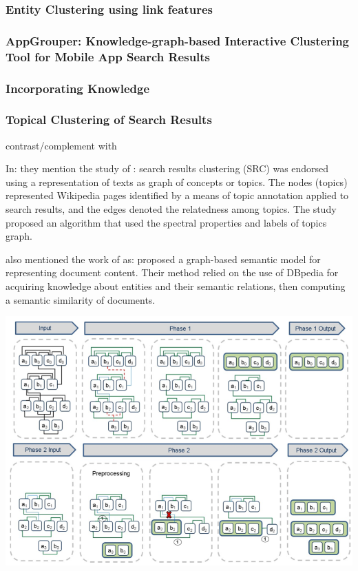 \documentclass[runningheads]{llncs}
\begin{document}
\subsubsection{Entity Clustering using link features} \label{entity-clustering}

\subsubsection{AppGrouper: Knowledge-graph-based Interactive Clustering Tool for Mobile App Search Results} \cite{Chang}

\subsubsection{Incorporating Knowledge }


\subsubsection{Topical Clustering of Search Results}
\cite{Scaiella} contrast/complement with \cite{Schuhmacher}

In: \cite{Elbattah} they mention the study of \cite{Scaiella}: search results clustering (SRC) was endorsed using a representation of texts as graph of concepts or topics. The nodes (topics) represented Wikipedia pages identified by a means of topic annotation applied to search results, and the edges denoted the relatedness among topics. The study proposed an algorithm that used the spectral properties and labels of topics graph. 

\cite{Elbattah} also mentioned the work of \cite{Schuhmacher} as: proposed a graph-based semantic model for representing document content. Their method relied on the use of DBpedia for acquiring knowledge about entities and their semantic relations, then computing a semantic similarity of documents.


\begin{center}
\includegraphics[width=1\textwidth]{clip_example.png}
\end{center}
\end{document}
